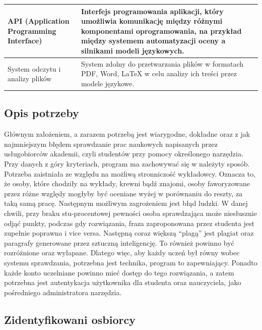 \documentclass[a4paper, 12pt]{article}
\begin{document}
\begin{center}
\begin{tabular}{|p{}|p{}|}
\hline
API (Application Programming Interface) & Interfejs programowania aplikacji, który umożliwia komunikację między różnymi komponentami oprogramowania, na przykład między systemem automatyzacji oceny a silnikami modeli językowych. \\
\hline
System odczytu i analizy plików & System zdolny do przetwarzania plików w formatach PDF, Word, LaTeX w celu analizy ich treści przez modele językowe. \\
\hline
\end{tabular}
\end{center}

\subsection{Opis potrzeby}
Głównym założeniem, a zarazem potrzebą jest wiarygodne, dokładne oraz z jak najmniejszym błędem sprawdzanie prac naukowych napisanych przez usługobiorców akademii, czyli studentów przy pomocy określonego narzędzia. Przy danych z góry kryteriach, program ma zachowywać się w należyty sposób.  Potrzeba zaistniała ze względu na możliwą stronniczość wykładowcy. Oznacza to, że osoby, które chodziły na wykłady, krewni bądź znajomi, osoby faworyzowane przez różne względy mogłyby być oceniane wyżej w porównaniu do reszty, za taką samą pracę. Następnym możliwym zagrożeniem jest błąd ludzki. W danej chwili, przy braku stu-procentowej pewności osoba sprawdzająca może niesłusznie odjąć punkty, podczas gdy rozwiązania, fraza zaproponowana przez studenta jest zupełnie poprawna i vice versa. Następną coraz większą “plagą” jest plagiat oraz paragrafy generowane przez sztuczną inteligencję. To również powinno być rozróżnione oraz wyłapane. Dlatego więc, aby każdy uczeń był równy wobec systemu sprawdzania, potrzebna jest technika, program to zapewniający. Ponadto każde konto uczelniane powinno mieć dostęp do tego rozwiązania, a zatem potrzebna jest autentykacja użytkownika dla studenta oraz nauczyciela, jako pośredniego administratora narzędzia.

\subsection{Zidentyfikowani osbiorcy}
\end{document}
